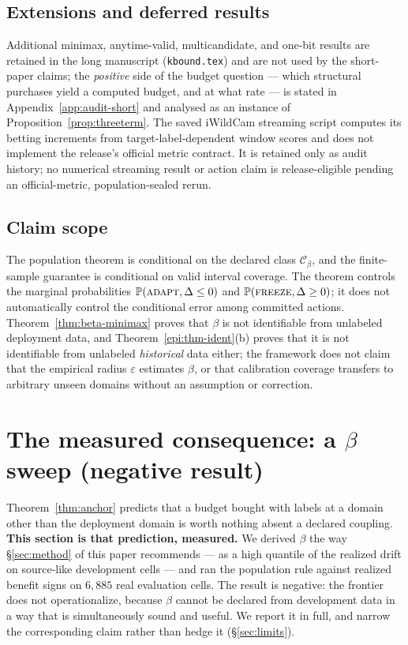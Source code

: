 \subsection{Extensions and deferred results}
Additional minimax, anytime-valid, multicandidate, and one-bit results are retained in the long
manuscript (\texttt{kbound.tex}) and are not used by the short-paper claims; the \emph{positive}
side of the budget question --- which structural purchases yield a computed budget, and at what
rate --- is stated in Appendix~\ref{app:audit-short} and analysed as an instance of
Proposition~\ref{prop:threeterm}. The saved iWildCam streaming script computes its betting
increments from target-label-dependent window scores and does not implement the release's official
metric contract. It is retained only as audit history; no numerical streaming result or action claim
is release-eligible pending an official-metric, population-sealed rerun.

\subsection{Claim scope}
The population theorem is conditional on the declared class $\mathcal C_\beta$, and the
finite-sample guarantee is conditional on valid interval coverage. The theorem controls the marginal
probabilities $\Pr(\textsc{adapt},\Delta\le0)$ and $\Pr(\textsc{freeze},\Delta\ge0)$; it does not
automatically control the conditional error among committed actions.
Theorem~\ref{thm:beta-minimax} proves that $\beta$ is not identifiable from unlabeled deployment
data, and Theorem~\ref{epi:thm-ident}(b) proves that it is not identifiable from unlabeled
\emph{historical} data either; the framework does not claim that the empirical radius $\varepsilon$
estimates $\beta$, or that calibration coverage transfers to arbitrary unseen domains without an
assumption or correction.

\section{The measured consequence: a $\beta$ sweep (negative
result)}\label{sec:beta-sweep}
Theorem~\ref{thm:anchor} predicts that a budget bought with labels at a domain other than the
deployment domain is worth nothing absent a declared coupling. \textbf{This section is that
prediction, measured.} We derived $\beta$ the way \S\ref{sec:method} of this paper recommends ---
as a high quantile of the realized drift on source-like development cells --- and ran the population
rule against realized benefit signs on $6{,}885$ real evaluation cells. The result is negative: the
frontier does not operationalize, because $\beta$ cannot be declared from development data in a way
that is simultaneously sound and useful. We report it in full, and narrow the corresponding claim
rather than hedge it (\S\ref{sec:limits}).

